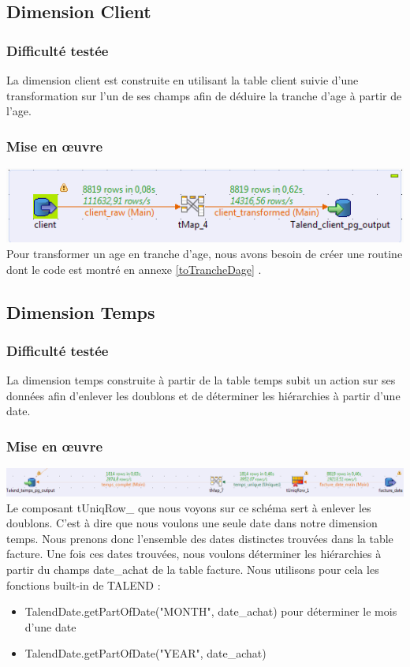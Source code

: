 \subsection{Dimension Client}
\subsubsection{Difficulté testée}
La dimension client est construite en utilisant la table client suivie d'une transformation sur l'un de ses champs afin de déduire la tranche d'age à partir de l'age.

\subsubsection{Mise en œuvre}
\includegraphics[scale=0.60]{images/dimension_client.PNG}\\

Pour transformer un age en tranche d'age, nous avons besoin de créer une routine dont le code est montré en annexe \ref{toTrancheDage} .

\subsection{Dimension Temps}
\subsubsection{Difficulté testée}
La dimension temps construite à partir de la table temps subit un action sur ses données afin d'enlever les doublons et de déterminer les hiérarchies à partir d'une date.
\subsubsection{Mise en œuvre}
\includegraphics[scale=0.60]{images/dimension_temps.PNG}\\
Le composant tUniqRow\_ que nous voyons sur ce schéma sert à enlever les doublons. C'est à dire que nous voulons une seule date dans notre dimension temps. Nous prenons donc l'ensemble des dates distinctes trouvées dans la table facture.
Une fois ces dates trouvées, nous voulons déterminer les hiérarchies à partir du champs date\_achat de la table facture. Nous utilisons pour cela les fonctions built-in de TALEND :
\begin{itemize}
\item TalendDate.getPartOfDate("MONTH", date\_achat) pour déterminer le mois d'une date
\item TalendDate.getPartOfDate("YEAR", date\_achat)
\end{itemize}

